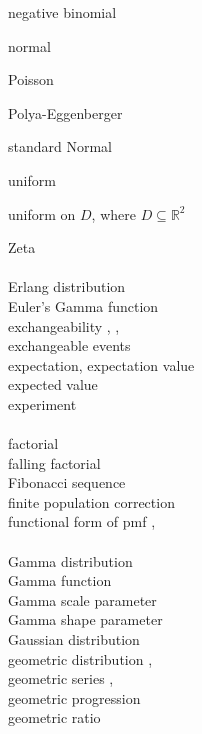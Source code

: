 \documentclass[12pt]{article}
\begin{document}
negative binomial \pageref{d:negbinom}

normal \pageref{normaldist}

Poisson \pageref{d:poissonlambda}

Polya-Eggenberger \pageref{polyaeggenberger}

standard Normal \pageref{stdnormaldist}

uniform \pageref{d:uniformabdist}

uniform on $D$, where $D\subseteq {\mathbb R}^2$ \quad \pageref{2duniform}

Zeta \pageref{zetadist}\\

\\
\noindent Erlang distribution \pageref{erlangdist}\\
\noindent Euler's Gamma function \pageref{d:eulergamma}\\
\noindent exchangeability \pageref{exchangeability1}, \pageref{exchangeability2}, \pageref{exchangeability3}\\
\noindent exchangeable events \pageref{exchangeableevents}\\
\noindent expectation, expectation value \pageref{expectationvalue}\\
\noindent expected value \pageref{d:expectedvaluediscrete}\\
\noindent experiment \pageref{d:experiment}\\

\\
\noindent factorial \pageref{factorial}\\
\noindent falling factorial \pageref{fallingfactorial}\\
\noindent Fibonacci sequence \pageref{fibonacci}\\
\noindent finite population correction \pageref{finitepopulationcorrection}\\
\noindent functional form of pmf \pageref{e:functionalformpmf}, \pageref{pmffunctionalform}\\

\\
\noindent Gamma distribution \pageref{gammapdf}\\
\noindent Gamma function \pageref{d:eulergamma}\\
\noindent Gamma scale parameter \pageref{gammascale}\\
\noindent Gamma shape parameter \pageref{gammashape}\\
\noindent Gaussian distribution \pageref{normaldist}\\
\noindent geometric distribution \pageref{geomfaircoin}, \pageref{d:geometricp}\\
\noindent geometric series \pageref{d:geomseries1}, \pageref{d:geomseries}\\
\noindent geometric progression \pageref{d:geomprog}\\
\noindent geometric ratio \pageref{d:geomratio}\\
\end{document}
